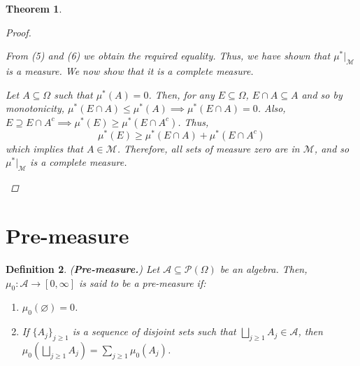 \documentclass{article}
\newcommand{\A}{\mathscr{A}}
\newcommand{\Po}{\mathscr{P}}
\newcommand{\M}{\mathcal{M}}
\theoremstyle{spaced}
\newtheorem{theorem}{Theorem}[section]
\newtheorem{definition}[theorem]{Definition}
\begin{document}
\begin{theorem}
\begin{proof}
\begin{enumerate}
       From (5) and (6) we obtain the required equality. Thus, we have shown that $\mu^*|_{\M}$ is a measure. We now show that it is a complete measure. 

       Let $A \subseteq \Omega$ such that $\mu^*(A) = 0$. Then, for any $E \subseteq \Omega$, $E \cap A \subseteq A$ and so by monotonicity, $\mu^*(E \cap A) \leq \mu^*(A) \implies \mu^*(E \cap A) = 0$. Also, $E \supseteq E \cap A^c \implies \mu^*(E) \geq \mu^*(E \cap A^c)$. Thus, 
       \[ \mu^*(E) \geq \mu^*(E \cap A) + \mu^*(E \cap A^c) \]
       which implies that $A \in \M$. Therefore, all sets of measure zero are in $\M$, and so $\mu^*|_{\M}$ is a complete measure. 
    \end{enumerate}
\end{proof}
\end{theorem}

\section{Pre-measure}

\begin{definition}
    (\textbf{Pre-measure.}) Let $\A \subseteq \Po(\Omega)$ be an algebra. Then, $\mu_0: \A \to [0, \infty]$ is said to be a \textit{pre-measure} if:
    \begin{enumerate}
        \item $\mu_0(\varnothing) = 0$.
        \item If $\{ A_j \}_{j \geq 1}$ is a sequence of disjoint sets such that $\bigsqcup_{j \geq 1} A_j \in \A$, then $\mu_0 \left( \bigsqcup_{j \geq 1} A_j \right) = \sum_{j \geq 1} \mu_0(A_j)$.
    \end{enumerate}
\end{definition}
\end{document}
